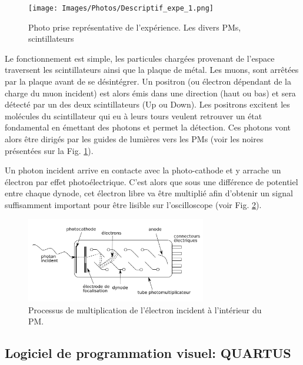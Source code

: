 \documentclass[12pt]{article}
\begin{document}
\begin{figure}[htpb!]
    \centering
    \texttt{[image: Images/Photos/Descriptif\_expe\_1.png]}
    \caption{Photo prise représentative de l'expérience. Les divers PMs, scintillateurs }
    \label{fig:Experience_1_montage}
\end{figure}

Le fonctionnement est simple, les particules chargées provenant de l'espace traversent les scintillateurs ainsi que la plaque de métal. Les muons, sont arrêtées par la plaque avant de se désintégrer. Un positron (ou électron dépendant de la charge du muon incident) est alors émis dans une direction (haut ou bas) et sera détecté par un des deux scintillateurs (Up ou Down). Les positrons excitent les molécules du scintillateur qui eu à leurs tours veulent retrouver un état fondamental en émettant des photons et permet la détection.  Ces photons vont alors être dirigés par les guides de lumières vers les PMs (voir les noires présentées sur la Fig. \ref{fig:Experience_1_montage}).

Un photon incident arrive en contacte avec la photo-cathode et y arrache un électron par effet photoélectrique. C'est alors que sous une différence de potentiel entre chaque dynode, cet électron libre va être multiplié afin d'obtenir un signal suffisamment important pour être lisible sur l'oscilloscope (voir Fig. \ref{fig:PM}).

\begin{figure}[htpb!]
    \centering
    \includegraphics[width=0.7\textwidth]{Images/Photos/PM.png}
    \captionsetup{width=0.9\textwidth}
    \caption{Processus de multiplication de l'électron incident à l'intérieur du PM.}
    \label{fig:PM}
\end{figure}

\newpage
\subsection{Logiciel de programmation visuel: QUARTUS}
\end{document}
